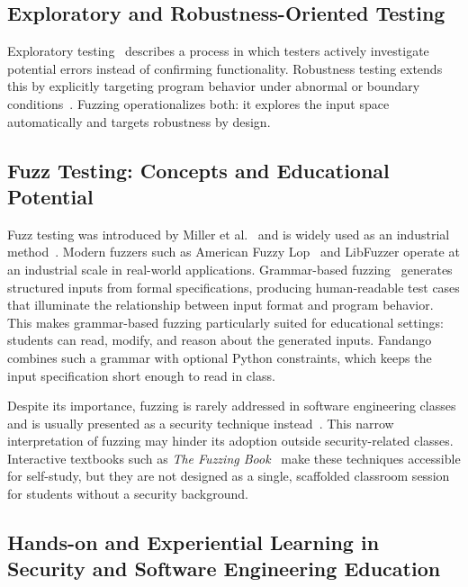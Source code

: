 \documentclass[conference]{IEEEtran}
\begin{document}
\subsection{Exploratory and Robustness-Oriented Testing}

Exploratory testing~\cite{whittaker2009exploratory} describes a process in which testers actively investigate potential errors instead of confirming functionality.
Robustness testing extends this by explicitly targeting program behavior under abnormal or boundary conditions~\cite{manes2019art}.
Fuzzing operationalizes both: it explores the input space automatically and targets robustness by design.

\subsection{Fuzz Testing: Concepts and Educational Potential}

Fuzz testing was introduced by Miller et al.~\cite{miller1990empirical} and is widely used as an industrial method~\cite{klees2018evaluating}.
Modern fuzzers such as American Fuzzy Lop~\cite{afl2021} and LibFuzzer operate at an industrial scale in real-world applications.
Grammar-based fuzzing~\cite{aschermann2019nautilus, zeller2019fuzzing} generates structured inputs from formal specifications, producing human-readable test cases that illuminate the relationship between input format and program behavior.
This makes grammar-based fuzzing particularly suited for educational settings: students can read, modify, and reason about the generated inputs.
Fandango~\cite{zamudio2025fandango} combines such a grammar with optional Python constraints, which keeps the input specification short enough to read in class.

Despite its importance, fuzzing is rarely addressed in software engineering classes and is usually presented as a security technique instead~\cite{klees2018evaluating}.
This narrow interpretation of fuzzing may hinder its adoption outside security-related classes.
Interactive textbooks such as \emph{The Fuzzing Book}~\cite{zeller2019fuzzing} make these techniques accessible for self-study, but they are not designed as a single, scaffolded classroom session for students without a security background.

\subsection{Hands-on and Experiential Learning in Security and Software Engineering Education}
\end{document}
